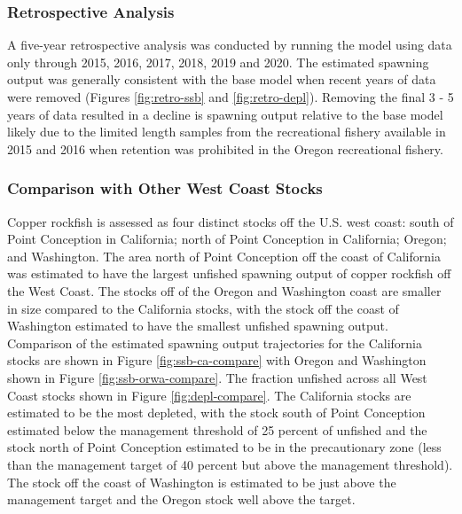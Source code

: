 \documentclass[11pt,
  english,
  a4paper,
]{article}
\begin{document}
\leavevmode\tagmcend\tagstructend\par


\hypertarget{retrospective-analysis}{%
\subsubsection{Retrospective Analysis}\label{retrospective-analysis}}

\leavevmode\tagmcend\tagstructend


A five-year retrospective analysis was conducted by running the model using data only through 2015, 2016, 2017, 2018, 2019 and 2020. The estimated spawning output was generally consistent with the base model when recent years of data were removed (Figures \ref{fig:retro-ssb} and \ref{fig:retro-depl}). Removing the final 3 - 5 years of data resulted in a decline is spawning output relative to the base model likely due to the limited length samples from the recreational fishery available in 2015 and 2016 when retention was prohibited in the Oregon recreational fishery.

\leavevmode\tagmcend\tagstructend\par


\hypertarget{comparison-with-other-west-coast-stocks}{%
\subsubsection{Comparison with Other West Coast Stocks}\label{comparison-with-other-west-coast-stocks}}

\leavevmode\tagmcend\tagstructend


Copper rockfish is assessed as four distinct stocks off the U.S. west coast: south of Point Conception in California; north of Point Conception in California; Oregon; and Washington. The area north of Point Conception off the coast of California was estimated to have the largest unfished spawning output of copper rockfish off the West Coast. The stocks off of the Oregon and Washington coast are smaller in size compared to the California stocks, with the stock off the coast of Washington estimated to have the smallest unfished spawning output. Comparison of the estimated spawning output trajectories for the California stocks are shown in Figure \ref{fig:ssb-ca-compare} with Oregon and Washington shown in Figure \ref{fig:ssb-orwa-compare}. The fraction unfished across all West Coast stocks shown in Figure \ref{fig:depl-compare}. The California stocks are estimated to be the most depleted, with the stock south of Point Conception estimated below the management threshold of 25 percent of unfished and the stock north of Point Conception estimated to be in the precautionary zone (less than the management target of 40 percent but above the management threshold). The stock off the coast of Washington is estimated to be just above the management target and the Oregon stock well above the target.
\end{document}
